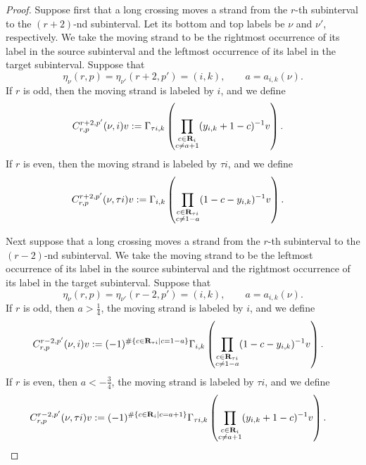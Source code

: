 \begin{proof}
Suppose first that a long crossing moves a strand from the \(r\)-th
subinterval to the \((r+2)\)-nd subinterval. Let its bottom and top labels be
\(\nu\) and \(\nu'\), respectively. We take the moving strand to be the
rightmost occurrence of its label in the source subinterval and the leftmost
occurrence of its label in the target subinterval. Suppose that
\[
\eta_\nu(r,p)
=
\eta_{\nu'}(r+2,p')
=
(i,k),
\qquad
a=a_{i,k}(\nu).
\]
If \(r\) is odd, then the moving strand is labeled by \(i\), and we define
\begin{equation}
\label{eq:Gamma-cross-right-odd}
\begin{aligned}
C_{r,p}^{r+2,p'}(\nu,i)v
:={}&
\Gamma_{\tau i,k}
\left(
\prod_{\substack{c\in\mathbf{R}_i\\
c\neq a+1}}
(y_{i,k}+1-c)^{-1}v
\right).
\end{aligned}
\end{equation}
If \(r\) is even, then the moving strand is labeled by \(\tau i\), and we
define
\begin{equation}
\label{eq:Gamma-cross-right-even}
\begin{aligned}
C_{r,p}^{r+2,p'}(\nu,\tau i)v
:={}&
\Gamma_{i,k}
\left(
\prod_{\substack{c\in\mathbf{R}_{\tau i}\\
c\neq1-a}}
(1-c-y_{i,k})^{-1}v
\right).
\end{aligned}
\end{equation}

Next suppose that a long crossing moves a strand from the \(r\)-th
subinterval to the \((r-2)\)-nd subinterval. We take the moving strand to be
the leftmost occurrence of its label in the source subinterval and the
rightmost occurrence of its label in the target subinterval. Suppose that
\[
   \eta_\nu(r,p)
   =
   \eta_{\nu'}(r-2,p')
   =
   (i,k),
   \qquad
   a=a_{i,k}(\nu).
\]
If \(r\) is odd, then \(a>\frac14\), the moving strand is labeled by \(i\),
and we define
\begin{equation}
\label{eq:Gamma-cross-left-odd}
\begin{aligned}
C_{r,p}^{r-2,p'}(\nu,i)v
:={}&
(-1)^{
\#\{c\in\mathbf{R}_{\tau i}\mid c=1-a\}
}
\Gamma_{i,k}
\left(
   \prod_{\substack{c\in\mathbf{R}_{\tau i}\\c\neq1-a}}
   (1-c-y_{i,k})^{-1}v
\right).
\end{aligned}
\end{equation}
If \(r\) is even, then \(a<-\frac34\), the moving strand is labeled by
\(\tau i\), and we define
\begin{equation}
\label{eq:Gamma-cross-left-even}
\begin{aligned}
C_{r,p}^{r-2,p'}(\nu,\tau i)v
:={}&
(-1)^{
\#\{c\in\mathbf{R}_i\mid c=a+1\}
}
\Gamma_{\tau i,k}
\left(
   \prod_{\substack{c\in\mathbf{R}_i\\c\neq a+1}}
   (y_{i,k}+1-c)^{-1}v
\right).
\end{aligned}
\end{equation}


\end{proof}
